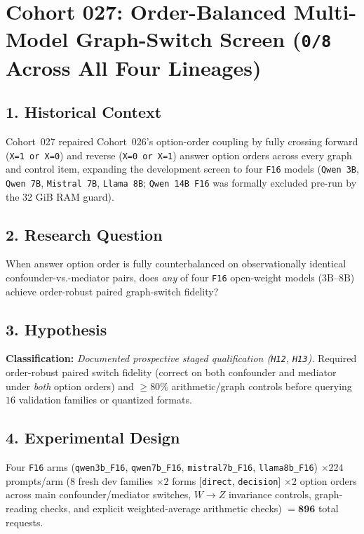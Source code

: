 \section{Cohort 027: Order-Balanced Multi-Model Graph-Switch Screen (\texttt{0/8} Across All Four Lineages)}

\subsection*{1. Historical Context}
Cohort~027 repaired Cohort~026's option-order coupling by fully crossing forward (\texttt{X=1 or X=0}) and reverse (\texttt{X=0 or X=1}) answer option orders across every graph and control item, expanding the development screen to four \texttt{F16} models (\texttt{Qwen 3B}, \texttt{Qwen 7B}, \texttt{Mistral 7B}, \texttt{Llama 8B}; \texttt{Qwen 14B F16} was formally excluded pre-run by the 32 GiB RAM guard).

\subsection*{2. Research Question}
When answer option order is fully counterbalanced on observationally identical confounder-vs.-mediator pairs, does \emph{any} of four \texttt{F16} open-weight models ($3\text{B}$--$8\text{B}$) achieve order-robust paired graph-switch fidelity?

\subsection*{3. Hypothesis}
\textbf{Classification:} \emph{Documented prospective staged qualification (\texttt{H12}, \texttt{H13}).} Required order-robust paired switch fidelity (correct on both confounder and mediator under \emph{both} option orders) and $\ge 80\%$ arithmetic/graph controls before querying $16$ validation families or quantized formats.

\subsection*{4. Experimental Design}
Four \texttt{F16} arms (\texttt{qwen3b\_F16}, \texttt{qwen7b\_F16}, \texttt{mistral7b\_F16}, \texttt{llama8b\_F16}) $\times 224$ prompts/arm ($8$ fresh dev families $\times 2$ forms [\texttt{direct}, \texttt{decision}] $\times 2$ option orders across main confounder/mediator switches, $W\to Z$ invariance controls, graph-reading checks, and explicit weighted-average arithmetic checks) $= \mathbf{896}$ total requests.

